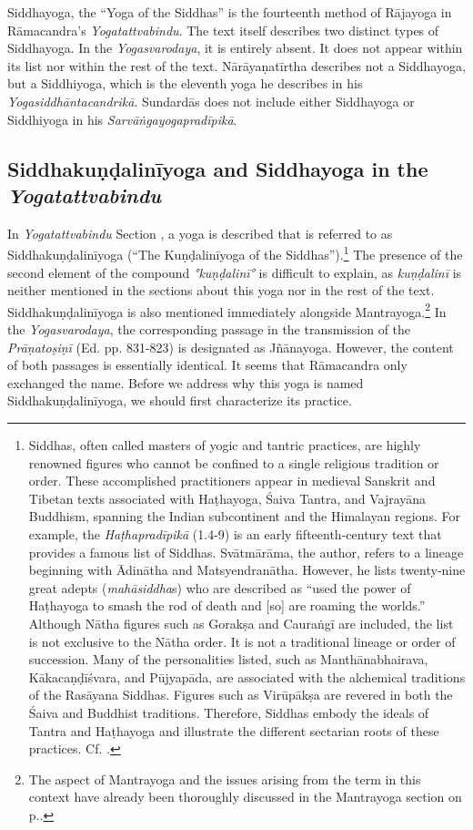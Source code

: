 Siddhayoga, the ``Yoga of the Siddhas'' is the fourteenth method of Rājayoga in Rāmacandra's \textit{Yogatattvabindu}. The text itself describes two distinct types of Siddhayoga. In the \textit{Yogasvarodaya}, it is entirely absent. It does not appear within its list nor within the rest of the text. Nārāyaṇatīrtha describes not a Siddhayoga, but a Siddhiyoga, which is the eleventh yoga he describes in his \textit{Yogasiddhāntacandrikā}. Sundardās does not include either Siddhayoga or Siddhiyoga in his \textit{Sarvāṅgayogapradīpikā}.

\subsection{Siddhakuṇḍalinīyoga and Siddhayoga in the \textit{Yogatattvabindu}} 

In \textit{Yogatattvabindu} Section , a yoga is described that is referred to as Siddhakuṇḍalinīyoga (``The Kuṇḍalinīyoga of the Siddhas'').\footnote{Siddhas, often called masters of yogic and tantric practices, are highly renowned figures who cannot be confined to a single religious tradition or order. These accomplished practitioners appear in medieval Sanskrit and Tibetan texts associated with Haṭhayoga, Śaiva Tantra, and Vajrayāna Buddhism, spanning the Indian subcontinent and the Himalayan regions. For example, the \emph{Haṭhapradīpikā} (1.4-9) is an early fifteenth-century text that provides a famous list of Siddhas. Svātmārāma, the author, refers to a lineage beginning with Ādinātha and Matsyendranātha. However, he lists twenty-nine great adepts (\textit{mahāsiddha}s) who are described as ``used the power of Haṭhayoga to smash the rod of death and [so] are roaming the worlds.'' Although Nātha figures such as Gorakṣa and Cauraṅgī are included, the list is not exclusive to the Nātha order. It is not a traditional lineage or order of succession. Many of the personalities listed, such as Manthānabhairava, Kākacaṇḍīśvara, and Pūjyapāda, are associated with the alchemical traditions of the Rasāyana Siddhas. Figures such as Virūpākṣa are revered in both the Śaiva and Buddhist traditions. Therefore, Siddhas embody the ideals of Tantra and Haṭhayoga and illustrate the different sectarian roots of these practices. Cf. \citeauthor[2023: 35-36]{powell2023}.} The presence of the second element of the compound \textit{°kuṇḍalinī°} is difficult to explain, as \textit{kuṇḍalinī} is neither mentioned in the sections about this yoga nor in the rest of the text. Siddhakuṇḍalinīyoga is also mentioned immediately alongside Mantrayoga.\footnote{The aspect of Mantrayoga and the issues arising from the term in this context have already been thoroughly discussed in the Mantrayoga section on p.\pageref{bindumantra}.} In the \textit{Yogasvarodaya}, the corresponding passage in the transmission of the \textit{Prāṇatoṣiṇī} (Ed. pp. 831-823) is designated as Jñānayoga. However, the content of both passages is essentially identical. It seems that Rāmacandra only exchanged the name. Before we address why this yoga is named Siddhakuṇḍalinīyoga, we should first characterize its practice.

